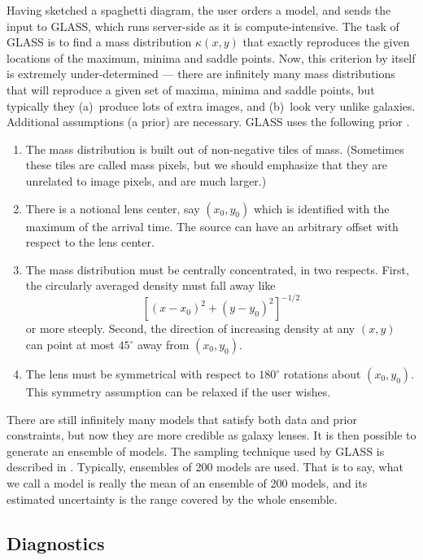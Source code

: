 Having sketched a spaghetti diagram, the user orders a model, and \spl
sends the input to GLASS, which runs server-side as it is
compute-intensive.  The task of GLASS is to find a mass distribution
$\kappa(x,y)$ that exactly reproduces the given locations of the
maximum, minima and saddle points. Now, this criterion by itself is
extremely under-determined --- there are infinitely many mass
distributions that will reproduce a given set of maxima, minima and
saddle points, but typically they (a)~produce lots of extra images,
and (b)~look very unlike galaxies.  Additional assumptions (a prior)
are necessary.  GLASS uses the following prior
\citep[cf.]{1997MNRAS.292..148S,2008ApJ...679...17C}.
\begin{enumerate}
\item The mass distribution is built out of non-negative tiles of
  mass.  (Sometimes these tiles are called mass pixels, but we should
  emphasize that they are unrelated to image pixels, and are much
  larger.)
\item There is a notional lens center, say $(x_0,y_0)$ which is
  identified with the maximum of the arrival time.  The source can
  have an arbitrary offset with respect to the lens center.
\item The mass distribution must be centrally concentrated, in two
  respects.  First, the circularly averaged density must fall away
  like $$ \left[(x-x_0)^2+(y-y_0)^2\right]^{-1/2}$$ or more steeply.
  Second, the direction of increasing density at any $(x,y)$ can point
  at most $45^\circ$ away from $(x_0,y_0)$.
\item The lens must be symmetrical with respect to $180^\circ$ rotations
  about $(x_0,y_0)$.  This symmetry assumption can be relaxed if the
  user wishes.
\end{enumerate}
There are still infinitely many models that satisfy both data and
prior constraints, but now they are more credible as galaxy lenses.
It is then possible to generate an ensemble of models.  The sampling
technique used by GLASS is described in \citep{Lubini2012}.
Typically, ensembles of 200 models are used.  That is to say, what we
call a \spl model is really the mean of an ensemble of 200 models, and
its estimated uncertainty is the range covered by the whole ensemble.

\subsection{Diagnostics} \label{sec:diag}

